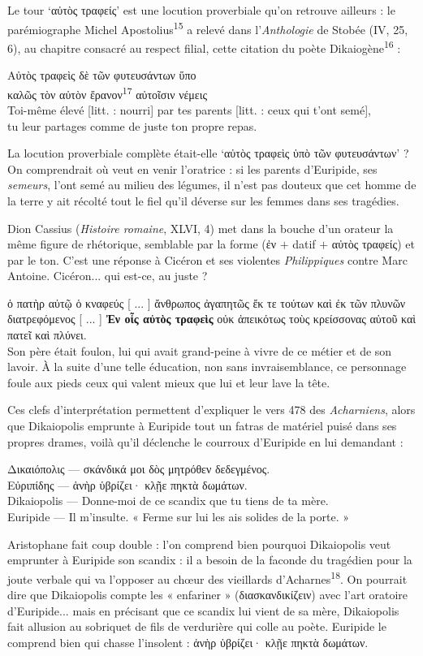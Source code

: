 \documentclass[12pt]{book}%
\newcommand{\italique}[1]{\textit{#1}}%
\newcommand{\citComm}[1]{\begin{quoting}[vskip=0pt] #1 \end{quoting}}%
\newcommand{\francais}[1]{{\policeFr #1}}%
\newcommand{\marqueur}[1]{\textsuperscript{#1}}%
\newenvironment{groupe}{%
\pstart%
\ledgroup%
}{%
\pend %
}%
\begin{document}
\begin{pages}
\begin{Leftside}
\begin{groupe}
{{Le tour `αὐτὸς τραφείς' est une locution proverbiale qu'on retrouve ailleurs : le parémiographe Michel Apostolius\marqueur{15} a relevé dans l'\italique{Anthologie} de Stobée (IV, 25, 6), au chapitre consacré au respect filial, cette citation du poète Dikaiogène\marqueur{16} :%
\citComm{Αὐτὸς τραφεὶς δὲ τῶν φυτευσάντων ὕπο\\
καλῶς τὸν αὐτὸν ἔρανον\marqueur{17} αὐτοῖσιν νέμεις\\
Toi-même élevé [litt. : nourri] par tes parents [litt. : ceux qui t'ont semé],\\
tu leur partages comme de juste ton propre repas.}
La locution proverbiale complète était-elle `αὐτὸς τραφεὶς ὑπὸ τῶν φυτευσάντων' ? On comprendrait où veut en venir l'oratrice : si les parents d'Euripide, ses \italique{semeurs}, l'ont semé au milieu des légumes, il n'est pas douteux que cet homme de la terre y ait récolté tout le fiel qu'il déverse sur les femmes dans ses tragédies.

Dion Cassius (\italique{Histoire romaine}, XLVI, 4) met dans la bouche d'un orateur la même figure de rhétorique, semblable par la forme (ἐν $+$ datif $+$ αὐτὸς τραφείς) et par le ton. C'est une réponse à Cicéron et ses violentes \italique{Philippiques} contre Marc Antoine. Cicéron... qui est-ce, au juste ?
\citComm{ὁ πατὴρ αὐτῷ ὁ κναφεύς [ ... ] ἄνθρωπος ἀγαπητῶς ἔκ τε τούτων καὶ ἐκ τῶν πλυνῶν διατρεφόμενος [ ... ] \textbf{Ἐν οἷς αὐτὸς τραφεὶς} οὐκ ἀπεικότως τοὺς κρείσσονας αὐτοῦ καὶ πατεῖ καὶ πλύνει.\\
\francais{Son père était foulon, lui qui avait grand-peine à vivre de ce métier et de son lavoir. À la suite d'une telle éducation, non sans invraisemblance, ce personnage foule aux pieds ceux qui valent mieux que lui et leur lave la tête.}}
Ces clefs d'interprétation permettent d'expliquer le vers 478 des \italique{Acharniens}, alors que Dikaiopolis emprunte à Euripide tout un fatras de matériel puisé dans ses propres drames, voilà qu'il déclenche le courroux d'Euripide en lui demandant :
\citComm{Δικαιόπολις --- σκάνδικά μοι δὸς μητρόθεν δεδεγμένος.\\
Εὐριπίδης --- ἁνὴρ ὑβρίζει· κλῇε πηκτὰ δωμάτων.\\
Dikaiopolis --- Donne-moi de ce scandix que tu tiens de ta mère.\\
Euripide --- Il m'insulte. « Ferme sur lui les ais solides de la porte. »}
Aristophane fait coup double : l'on comprend bien pourquoi Dikaiopolis veut emprunter à Euripide son scandix : il a besoin de la faconde du tragédien pour la joute verbale qui va l'opposer au chœur des vieillards d'Acharnes\marqueur{18}. 
On pourrait dire que Dikaiopolis compte les « enfariner » (διασκανδικίζειν) avec l'art oratoire d'Euripide... mais en précisant que ce scandix lui vient de sa mère, Dikaiopolis fait allusion au sobriquet de fils de verdurière qui colle au poète.
Euripide le comprend bien qui chasse l'insolent : ἁνὴρ ὑβρίζει· κλῇε πηκτὰ δωμάτων.\\

}}
\end{groupe}
\end{Leftside}
\end{pages}
\end{document}
